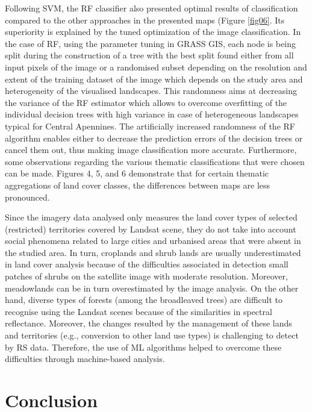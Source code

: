 \documentclass[jimaging,article,submit,pdftex,moreauthors]{Definitions/mdpi}
\begin{document}
Following SVM, the RF classifier also presented optimal results of classification compared to the other approaches in the presented maps (Figure \ref{fig06}. Its superiority is explained by the tuned optimization of the image classification. In the case of RF, using the parameter tuning in GRASS GIS, each node is being split during the construction of a tree with the best split found either from all input pixels of the image or a randomised subset depending on the resolution and extent of the training dataset of the image which depends on the study area and heterogeneity of the visualised landscapes. This randomness aims at decreasing the variance of the RF estimator which allows to overcome overfitting of the individual decision trees with high variance in case of heterogeneous landscapes typical for Central Apennines. The artificially increased randomness of the RF algorithm enables either to decrease the prediction errors of the decision trees or cancel them out, thus making image classification more accurate. Furthermore, some observations regarding the various thematic classifications that were chosen can be made.  Figures 4, 5, and 6 demonstrate that for certain thematic aggregations of land cover classes, the differences between maps are less pronounced.

Since the imagery data analysed only measures the land cover types of selected (restricted) territories covered by Landsat scene, they do not take into account social phenomena related to large cities and urbanised areas that were absent in the studied area. In turn, croplands and shrub lands are usually underestimated in land cover analysis because of the difficulties associated in detection small patches of shrubs on the satellite image with moderate resolution. Moreover, meadowlands can be in turn overestimated by the image analysis. On the other hand, diverse types of forests (among the broadleaved trees) are difficult to recognise using the Landsat scenes because of the similarities in spectral reflectance. Moreover, the changes resulted by the management of these lands and territories (e.g., conversion to other land use types) is challenging to detect by RS data. Therefore, the use of ML algorithms helped to overcome these difficulties through machine-based analysis.

\section{Conclusion}
\label{sec5}
\end{document}
